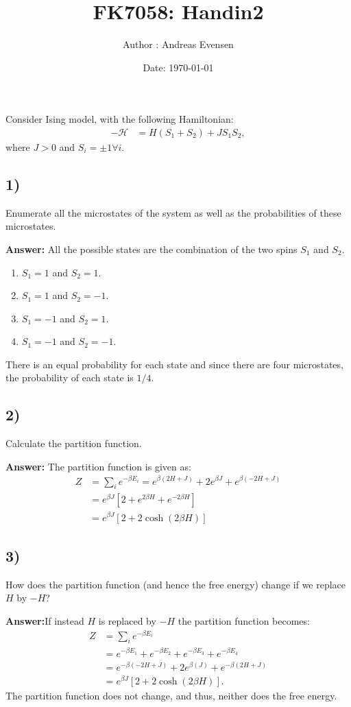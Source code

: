\documentclass[a4paper]{article}
\title{FK7058: Handin2}
\author{Author : Andreas Evensen}
\date{Date: \today}
\newcommand{\newparagraph}{\vspace{.5cm}\noindent}
\begin{document}
\maketitle
\noindent
Consider Ising model, with the following Hamiltonian:
\begin{align*}
    -\mathcal{H} &= H(S_1 + S_2) + JS_1S_2,
\end{align*}where $J >0$ and $S_i = \pm 1 \forall i$.

\subsection*{1)}
Enumerate all the microstates of the system as well as the probabilities of these microstates.

\newparagraph
\textbf{Answer:} All the possible states are the combination of the two spins $S_1$ and $S_2$.
\begin{enumerate}
    \item $S_1 = 1$ and $S_2 = 1$. 
    \item $S_1 = 1$ and $S_2 = -1$. 
    \item $S_1 = -1$ and $S_2 = 1$. 
    \item $S_1 = -1$ and $S_2 = -1$. 
\end{enumerate}There is an equal probability for each state and since there are four microstates, the probability of each state is $1/4$.

\subsection*{2)}
Calculate the partition function.

\newparagraph
\textbf{Answer:} The partition function is given as:
\begin{align*}
    Z &= \sum_i e^{-\beta E_i} = e^{\beta(2H + J)} + 2e^{\beta J} + e^{\beta(-2H + J)}\\
    &= e^{\beta J}\left[2 + e^{2\beta H} + e^{-2\beta H}\right]\\
    &= e^{\beta J}\left[2 + 2\cosh(2\beta H)\right]
\end{align*}

\subsection*{3)}
How does the partition function (and hence the free energy) change if we replace $H$ by $-H$?

\newparagraph
\textbf{Answer:}If instead $H$ is replaced by $-H$ the partition function becomes:
\begin{align*}
    Z &= \sum_i e^{-\beta E_i}\\
    &=e^{-\beta E_1} + e^{-\beta E_2} + e^{-\beta E_3} + e^{-\beta E_4}\\
    &= e^{-\beta (-2H + J)} + 2e^{\beta (J)} + e^{-\beta (2H + J)}\\
    &= e^{\beta J}\left[2 + 2\cosh(2\beta H)\right].
\end{align*}The partition function does not change, and thus, neither does the free energy.
\end{document}
